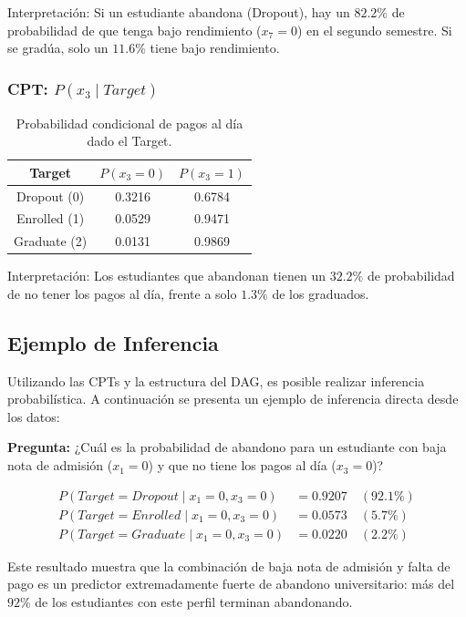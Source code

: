 \documentclass[12pt,a4paper]{article}
\begin{document}
Interpretación: Si un estudiante abandona (Dropout), hay un $82.2\%$ de probabilidad de que tenga bajo rendimiento ($x_7 = 0$) en el segundo semestre. Si se gradúa, solo un $11.6\%$ tiene bajo rendimiento.

\subsubsection{CPT: $P(x_3 \mid Target)$}

\begin{table}[H]
    \centering
    \begin{tabular}{c|cc}
        \toprule
        \textbf{Target} & $P(x_3=0)$ & $P(x_3=1)$ \\
        \midrule
        Dropout (0) & 0.3216 & 0.6784 \\
        Enrolled (1) & 0.0529 & 0.9471 \\
        Graduate (2) & 0.0131 & 0.9869 \\
        \bottomrule
    \end{tabular}
    \caption{Probabilidad condicional de pagos al día dado el Target.}
\end{table}

Interpretación: Los estudiantes que abandonan tienen un $32.2\%$ de probabilidad de no tener los pagos al día, frente a solo $1.3\%$ de los graduados.

\subsection{Ejemplo de Inferencia}

Utilizando las CPTs y la estructura del DAG, es posible realizar inferencia probabilística. A continuación se presenta un ejemplo de inferencia directa desde los datos:

\textbf{Pregunta:} ¿Cuál es la probabilidad de abandono para un estudiante con baja nota de admisión ($x_1 = 0$) y que no tiene los pagos al día ($x_3 = 0$)?

\begin{align*}
    P(Target = Dropout \mid x_1 = 0, x_3 = 0) &= 0.9207 \quad (92.1\%) \\
    P(Target = Enrolled \mid x_1 = 0, x_3 = 0) &= 0.0573 \quad (5.7\%) \\
    P(Target = Graduate \mid x_1 = 0, x_3 = 0) &= 0.0220 \quad (2.2\%)
\end{align*}

Este resultado muestra que la combinación de baja nota de admisión y falta de pago es un predictor extremadamente fuerte de abandono universitario: más del $92\%$ de los estudiantes con este perfil terminan abandonando.
\end{document}
